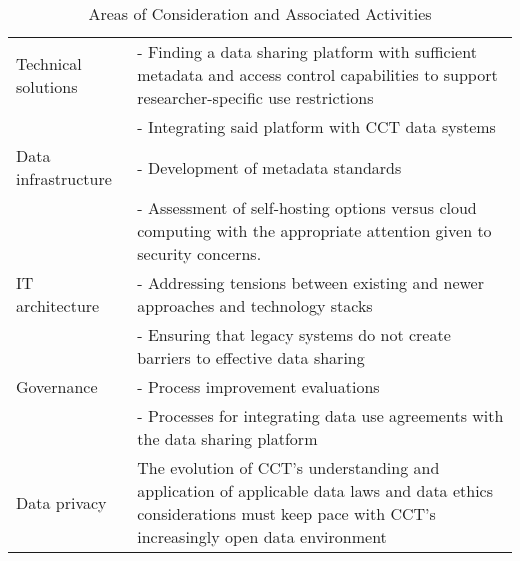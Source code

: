 % 

\begin{table}

\caption{\label{tab:ccttable1}Areas of Consideration and Associated Activities}
\centering
\begin{tabulary}{\ourtablewidth}{lL}
\toprule
Technical solutions & - Finding a data sharing platform with sufficient metadata and access control capabilities to support researcher-specific use restrictions\\
                    & - Integrating said platform with CCT data systems\\
Data infrastructure & - Development of metadata standards\\
                    & - Assessment of self-hosting options versus cloud computing with the appropriate attention given to security concerns.\\
IT architecture 	& - Addressing tensions between existing and newer approaches and technology stacks\\
                    & - Ensuring that legacy systems do not create barriers to effective data sharing\\
Governance 	        & - Process improvement evaluations\\
                    & - Processes for integrating data use agreements with the data sharing platform\\
Data privacy        & The evolution of CCT's understanding and application of applicable data laws and data ethics considerations must keep pace with CCT's increasingly open data environment\\
\bottomrule
\end{tabulary}
\end{table}